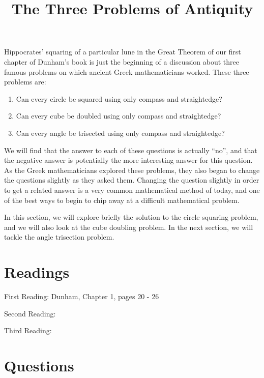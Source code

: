\documentclass{ximera}
\title{The Three Problems of Antiquity}
\begin{document}
\begin{abstract}
\end{abstract}
\maketitle

Hippocrates' squaring of a particular lune in the Great Theorem of our first chapter of Dunham's book is just the beginning of a discussion about three famous problems on which ancient Greek mathematicians worked.  These three problems are:
\begin{enumerate}
	\item Can every circle be squared using only compass and straightedge?
	\item Can every cube be doubled using only compass and straightedge?
	\item Can every angle be trisected using only compass and straightedge?
\end{enumerate}
We will find that the answer to each of these questions is actually ``no'', and that the negative answer is potentially the more interesting answer for this question.  As the Greek mathematicians explored these problems, they also began to change the questions slightly as they asked them.  Changing the question slightly in order to get a related answer is a very common mathematical method of today, and one of the best ways to begin to chip away at a difficult mathematical problem.  

In this section, we will explore briefly the solution to the circle squaring problem, and we will also look at the cube doubling problem.  In the next section, we will tackle the angle trisection problem.



\section{Readings}

First Reading: Dunham, Chapter 1, pages 20 - 26

Second Reading: 

Third Reading: 



\section{Questions}
\end{document}
